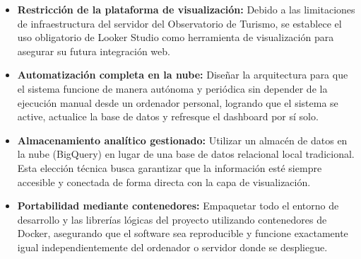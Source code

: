 \begin{itemize}
    \item \textbf{Restricción de la plataforma de visualización:} Debido a las limitaciones de infraestructura del servidor del Observatorio de Turismo, se establece el uso obligatorio de Looker Studio como herramienta de visualización para asegurar su futura integración web.
    \item \textbf{Automatización completa en la nube:} Diseñar la arquitectura para que el sistema funcione de manera autónoma y periódica sin depender de la ejecución manual desde un ordenador personal, logrando que el sistema se active, actualice la base de datos y refresque el dashboard por sí solo.
    \item \textbf{Almacenamiento analítico gestionado:} Utilizar un almacén de datos en la nube (BigQuery) en lugar de una base de datos relacional local tradicional. Esta elección técnica busca garantizar que la información esté siempre accesible y conectada de forma directa con la capa de visualización.
    \item \textbf{Portabilidad mediante contenedores:} Empaquetar todo el entorno de desarrollo y las librerías lógicas del proyecto utilizando contenedores de Docker, asegurando que el software sea reproducible y funcione exactamente igual independientemente del ordenador o servidor donde se despliegue.
\end{itemize}
